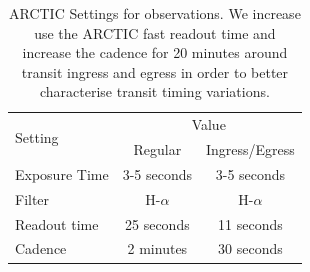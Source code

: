 \documentclass[twocolumn]{aastex631}
\begin{document}
\begin{table}[htb]
    \centering
    \begin{tabular}{l|c|c} 
        \hline
        \multicolumn{1}{l|}{\multirow{2}{*}{Setting}} & \multicolumn{2}{c}{Value}                                         \\ \cline{2-3} 
\multicolumn{1}{l|}{}                         & \multicolumn{1}{c|}{Regular} & \multicolumn{1}{c}{Ingress/Egress} \\
        \hline\hline
        Exposure Time & 3-5 seconds & 3-5 seconds\\
        Filter & H-$\alpha$ & H-$\alpha$ \\
        Readout time & 25 seconds & 11 seconds \\
        Cadence & 2 minutes & 30 seconds \\
        \hline
    \end{tabular}
    \caption{ARCTIC Settings for observations. We increase use the ARCTIC fast readout time and increase the cadence for 20 minutes around transit ingress and egress in order to better characterise transit timing variations.}
    \label{tab:settings}
\end{table}


{}
\end{document}
